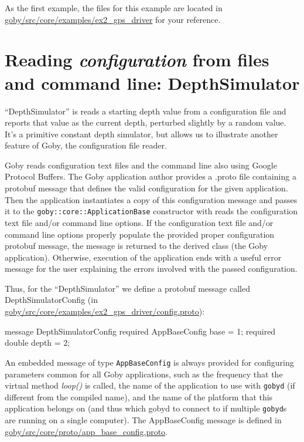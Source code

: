 \documentclass[11pt, letterpaper, oneside]{memoir}
\begin{document}
As the first example, the files for this example are located in \href{http://bazaar.launchpad.net/~goby-dev/goby/trunk/files/head:/src/core/examples/ex2_gps_driver}{goby/src/core/examples/ex2\_gps\_driver} for your reference. 

\section{Reading \textit{configuration} from files and command line: DepthSimulator}

``DepthSimulator'' is reads a starting depth value from a configuration file and reports that value as the current depth, perturbed slightly by a random value. It's a primitive constant depth simulator, but allows us to illustrate another feature of Goby, the configuration file reader.

Goby reads configuration text files and the command line also using Google Protocol Buffers. The Goby application author provides a .proto file containing a protobuf message that defines the valid configuration for the given application. Then the application instantiates a copy of this configuration message and passes it to the \verb|goby::core::ApplicationBase| constructor with reads the configuration text file and/or command line options. If the configuration text file and/or command line options properly populate the provided proper configuration protobuf message, the message is returned to the derived class (the Goby application). Otherwise, execution of the application ends with a useful error message for the user explaining the errors involved with the passed configuration. 

Thus, for the ``DepthSimulator'' we define a protobuf message called DepthSimulatorConfig (in \href{http://bazaar.launchpad.net/~goby-dev/goby/trunk/annotate/head:/src/core/examples/ex2_gps_driver/config.proto}{goby/src/core/examples/ex2\_gps\_driver/config.proto}):

\begin{boxedverbatim}
message DepthSimulatorConfig
{
  required AppBaseConfig base = 1;
  required double depth = 2;
}
\end{boxedverbatim}
\resetbvlinenumber

An embedded message of type \verb|AppBaseConfig| is always provided for configuring parameters common for all Goby applications, such as the frequency that the virtual method \textit{loop()} is called, the name of the application to use with \verb|gobyd| (if different from the compiled name), and the name of the platform that this application belongs on (and thus which gobyd to connect to if multiple \verb|gobyd|s are running on a single computer). The AppBaseConfig message is defined in \href{http://bazaar.launchpad.net/~goby-dev/goby/trunk/annotate/head:/src/core/proto/app_base_config.proto}{goby/src/core/proto/app\_base\_config.proto}.
\end{document}
